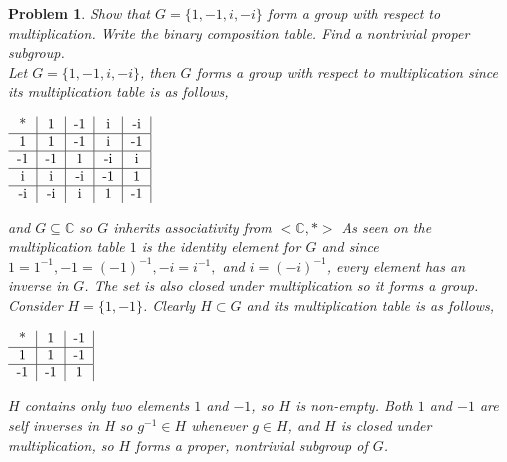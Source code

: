 \documentclass{article}
\newtheorem{Problem}{Problem}
\begin{document}
\begin{Problem}
Show that $G=\{1,-1,i,-i\}$ form a group with respect to multiplication.  Write the binary composition table.  Find a nontrivial proper subgroup. \\
Let $G=\{1,-1,i,-i\}$, then $G$ forms a group with respect to multiplication since its multiplication table is as follows, \begin{center} $\begin{tabular}{c|c|c|c|c|}
* & 1 & -1 & i & -i \\ \hline
1 & 1 & -1 & i & -1 \\ \hline
-1 & -1 & 1 & -i & i \\ \hline
i & i & -i & -1 & 1 \\ \hline
-i & -i & i & 1 & -1 \end{tabular}$ \end{center}
and $G\subseteq \mathbb{C}$ so $G$ inherits associativity from $<\mathbb{C}, *>$  As seen on the multiplication table $1$ is the identity element for $G$ and since $1=1^{-1},-1=(-1)^{-1},-i=i^{-1},$ and $i=(-i)^{-1}$, every element has an inverse in $G$.  The set is also closed under multiplication so it forms a group.  \\
Consider $H=\{1,-1\}$.  Clearly $H\subset G$ and its multiplication table is as follows,
\begin{center} $\begin{tabular}{c|c|c|}
* & 1 & -1 \\ \hline
1 & 1 & -1 \\ \hline
-1 & -1 & 1 \end{tabular}$ \end{center}
$H$ contains only two elements $1$ and $-1$, so $H$ is non-empty.  Both $1$ and $-1$ are self inverses in H so $g^{-1}\in H$ whenever $g\in H$, and $H$ is closed under multiplication, so $H$ forms a proper, nontrivial subgroup of $G$.
\end{Problem}
\end{document}

